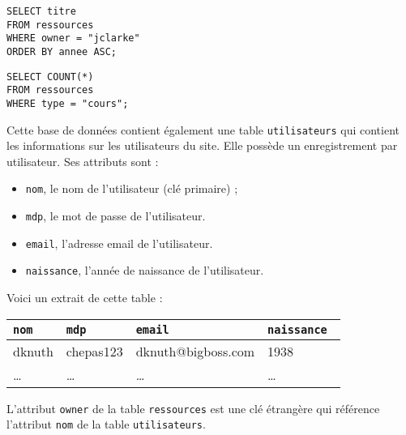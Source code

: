 \documentclass[11pt,a4paper]{article}
\begin{document}
\begin{Exercise}[title = {Base de données et {\sc sql}}, origin = {\bac \; {\sc capes nsi 2021}, épreuve 1} ]
\ifcorrige
\begin{verbatim}
SELECT titre 
FROM ressources 
WHERE owner = "jclarke"
ORDER BY annee ASC;
\end{verbatim}
\fi
{}
\ifcorrige
\begin{verbatim}
SELECT COUNT(*)
FROM ressources
WHERE type = "cours";
\end{verbatim}
\fi
{}

\NRet
Cette base de données contient également une table {\tt utilisateurs} qui contient les informations sur les utilisateurs du site. Elle possède un enregistrement par utilisateur. Ses attributs sont :
\begin{itemize}
	\item {\tt nom}, le nom de l'utilisateur (clé primaire) ;
	\item {\tt mdp}, le mot de passe de l'utilisateur.
	\item {\tt email}, l'adresse email de l'utilisateur.
	\item {\tt naissance}, l'année de naissance de l'utilisateur.
\end{itemize}
Voici un extrait de cette table :
\medskip
\begin{center}
	\begin{tabular}{|l|l|l|l|}
		\hline
		{\tt nom}       & {\tt mdp}                          & {\tt email}    &  {\tt naissance }\\
		\hline
		dknuth        &      chepas123                    & dknuth@bigboss.com &  1938 \\
		\hline
		\dots & \dots & \dots & \dots \\
	\end{tabular}
\end{center}
L'attribut {\tt owner} de la table {\tt ressources} est une clé étrangère qui référence l'attribut {\tt nom} de la table {\tt utilisateurs}.
\Ret
{}
\end{Exercise}
\end{document}

